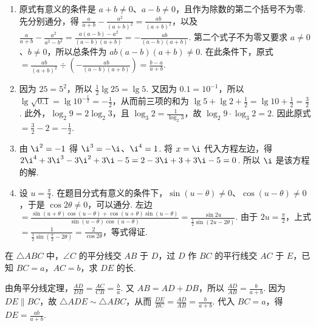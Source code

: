 \begin{solution}
\begin{enumerate}
\item 原式有意义的条件是 \(a+b\ne0\)、\(a-b\ne0\)，且作为除数的第二个括号不为零. 先分别通分，得 \(\frac{a}{a+b}-\frac{a^2}{(a+b)^2}=\frac{ab}{(a+b)^2}\)，以及 \(\frac{a}{a+b}-\frac{a^2}{a^2-b^2}=\frac{a(a-b)-a^2}{(a-b)(a+b)}=-\frac{ab}{(a-b)(a+b)}\). 第二个式子不为零又要求 \(a\ne0\)、\(b\ne0\)，所以总条件为 \(ab(a-b)(a+b)\ne0\). 在此条件下，原式 \(=\frac{ab}{(a+b)^2}\div\left(-\frac{ab}{(a-b)(a+b)}\right)=\frac{b-a}{a+b}\).

\item 因为 \(25=5^2\)，所以 \(\frac{1}{2}\lg25=\lg5\). 又因为 \(0.1=10^{-1}\)，所以 \(\lg\sqrt{0.1}=\lg10^{-\frac{1}{2}}=-\frac{1}{2}\)，从而前三项的和为 \(\lg5+\lg2+\frac{1}{2}=\lg10+\frac{1}{2}=\frac{3}{2}\). 此外，\(\log_2 9=2\log_2 3\)，且 \(\log_3 2=\frac{1}{\log_2 3}\)，故 \(\log_2 9\cdot\log_3 2=2\). 因此原式 \(=\frac{3}{2}-2=-\frac{1}{2}\).

\item 由 \(\i^2=-1\) 得 \(\i^3=-\i\)、\(\i^4=1\). 将 \(x=\i\) 代入方程左边，得 \(2\i^4+3\i^3-3\i^2+3\i-5=2-3\i+3+3\i-5=0\). 所以 \(\i\) 是该方程的解.

\item 设 \(u=\frac{\pi}{4}\). 在题目分式有意义的条件下，\(\sin(u-\theta)\ne0\)、\(\cos(u-\theta)\ne0\)，于是 \(\cos2\theta\ne0\)，可以通分. 左边 \(=\frac{\sin(u+\theta)\cos(u-\theta)+\cos(u+\theta)\sin(u-\theta)}{\sin(u-\theta)\cos(u-\theta)}=\frac{\sin2u}{\frac{1}{2}\sin(2u-2\theta)}\). 由于 \(2u=\frac{\pi}{2}\)，上式 \(=\frac{1}{\frac{1}{2}\sin(\frac{\pi}{2}-2\theta)}=\frac{2}{\cos2\theta}\)，等式得证.
\end{enumerate}
\end{solution}

\begin{problem}
在 \(\triangle ABC\) 中，\(\angle C\) 的平分线交 \(AB\) 于 \(D\)，过 \(D\) 作 \(BC\) 的平行线交 \(AC\) 于 \(E\)，已知 \(BC=a\)，\(AC=b\)，求 \(DE\) 的长.

\end{problem}

\begin{solution}
由角平分线定理，\(\frac{AD}{DB}=\frac{AC}{CB}=\frac{b}{a}\). 又 \(AB=AD+DB\)，所以 \(\frac{AD}{AB}=\frac{b}{a+b}\). 因为 \(DE\parallel BC\)，故 \(\triangle ADE\sim\triangle ABC\)，从而 \(\frac{DE}{BC}=\frac{AD}{AB}=\frac{b}{a+b}\). 代入 \(BC=a\)，得 \(DE=\frac{ab}{a+b}\).
\end{solution}

